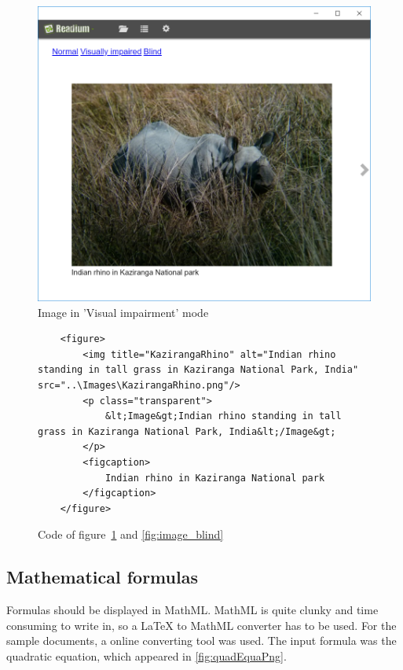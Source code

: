 \begin{figure}[H]
	\centering
	\includegraphics[width=\linewidth]{figures/ImageVi.PNG}
	\caption{Image in 'Visual impairment' mode}
	\label{fig:image_viimp}
\end{figure}



\begin{figure}[H]
	\begin{lstlisting}
	<figure>
		<img title="KazirangaRhino" alt="Indian rhino standing in tall grass in Kaziranga National Park, India" src="..\Images\KazirangaRhino.png"/>
		<p class="transparent">
			&lt;Image&gt;Indian rhino standing in tall grass in Kaziranga National Park, India&lt;/Image&gt;
		</p>
		<figcaption> 
			Indian rhino in Kaziranga National park
		</figcaption>
	</figure>
	\end{lstlisting}
	\caption{Code of figure~\ref{fig:image_viimp} and \ref{fig:image_blind}}
	\label{fig:image_code}
\end{figure}

\subsection{Mathematical formulas}

Formulas should be displayed in MathML. MathML is quite clunky and time consuming to write in, so a LaTeX to MathML converter has to be used. For the sample documents, a online converting tool was used. The input formula was the quadratic equation, which appeared in \ref{fig:quadEquaPng}.

